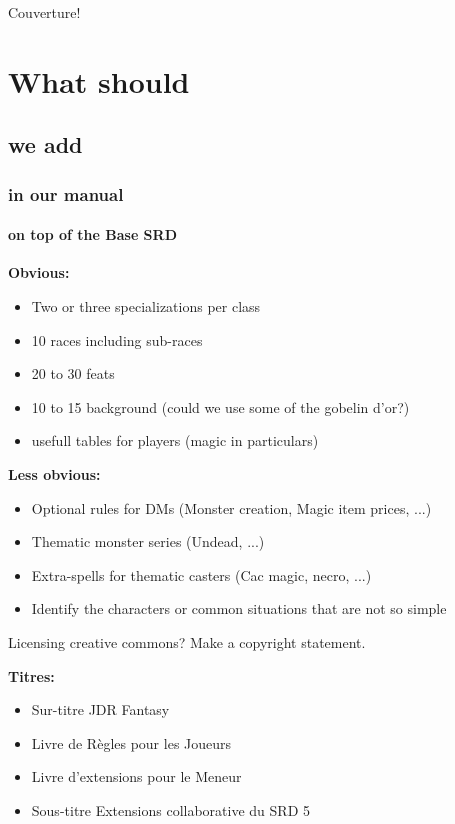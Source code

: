 \documentclass{dd}
\begin{document}
Couverture!

\clearpage



\tableofcontents


\chapter{What should}

\section{we add}
\subsection{in our manual}
\subsubsection{on top of the Base SRD}
\bfseries{Obvious:}
\begin{itemize}
  \item Two or three specializations per class
  \item 10 races including sub-races
  \item 20 to 30 feats
  \item 10 to 15 background (could we use some of the gobelin d'or?)
  \item usefull tables for players (magic in particulars)
\end{itemize}

\bfseries{Less obvious:}
\begin{itemize}
  \item Optional rules for DMs (Monster creation, Magic item prices, ...)
  \item Thematic monster series (Undead, ...)
  \item Extra-spells for thematic casters (Cac magic, necro, ...)
  \item Identify the characters or common situations that are not so simple
\end{itemize}

Licensing creative commons?
Make a copyright statement.

\bfseries{Titres:}
\begin{itemize}
  \item Sur-titre JDR Fantasy
  \item Livre de Règles pour les Joueurs
  \item Livre d'extensions pour le Meneur 
  \item Sous-titre Extensions collaborative du SRD 5
\end{itemize}
\end{document}
